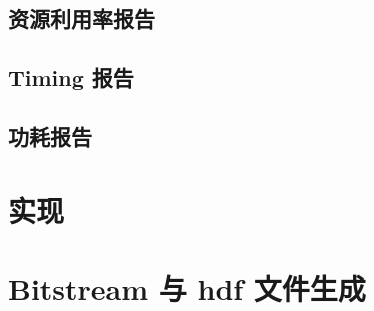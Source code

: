 \subsection{资源利用率报告}

\subsection{Timing 报告}

\subsection{功耗报告}

\section{实现}

\section{Bitstream 与 hdf 文件生成}










